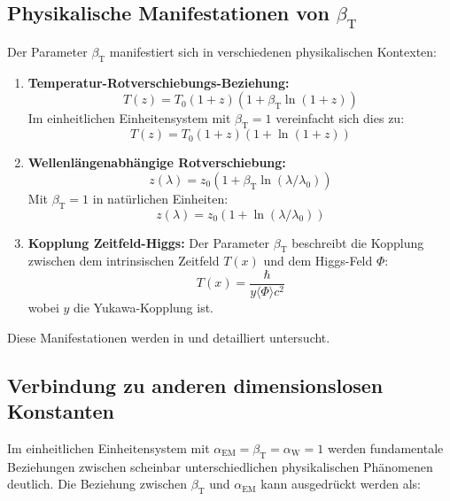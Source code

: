 \documentclass[12pt,a4paper]{article}
\newcommand{\Tfield}{T(x)}
\newcommand{\betaT}{\beta_{\text{T}}}
\newcommand{\alphaEM}{\alpha_{\text{EM}}}
\newcommand{\alphaW}{\alpha_{\text{W}}}
\begin{document}
	\subsection{Physikalische Manifestationen von \(\betaT\)}
	\label{subsec:beta_manifestations}
	
	Der Parameter \(\betaT\) manifestiert sich in verschiedenen physikalischen Kontexten:
	
	\begin{enumerate}
		\item \textbf{Temperatur-Rotverschiebungs-Beziehung:} 
		\begin{equation}
			\label{eq:temp_redshift}
			T(z) = T_0 (1 + z) (1 + \betaT \ln(1 + z))
		\end{equation}
		Im einheitlichen Einheitensystem mit \(\betaT = 1\) vereinfacht sich dies zu:
		\begin{equation}
			T(z) = T_0 (1 + z) (1 + \ln(1 + z))
		\end{equation}
		\item \textbf{Wellenlängenabhängige Rotverschiebung:} 
		\begin{equation}
			z(\lambda) = z_0 (1 + \betaT \ln(\lambda/\lambda_0))
		\end{equation}
		Mit \(\betaT = 1\) in natürlichen Einheiten:
		\begin{equation}
			z(\lambda) = z_0 (1 + \ln(\lambda/\lambda_0))
		\end{equation}
		\item \textbf{Kopplung Zeitfeld-Higgs:} Der Parameter \(\betaT\) beschreibt die Kopplung zwischen dem intrinsischen Zeitfeld \(\Tfield\) und dem Higgs-Feld \(\Phi\):
		\begin{equation}
			\Tfield = \frac{\hbar}{y \langle \Phi \rangle c^2}
		\end{equation}
		wobei \(y\) die Yukawa-Kopplung ist.
	\end{enumerate}
	
	Diese Manifestationen werden in \cite{pascher_params_2025} und \cite{pascher_alphabeta_2025} detailliert untersucht.
	
	\subsection{Verbindung zu anderen dimensionslosen Konstanten}
	\label{subsec:connection_constants}
	
	Im einheitlichen Einheitensystem mit \(\alphaEM = \betaT = \alphaW = 1\) werden fundamentale Beziehungen zwischen scheinbar unterschiedlichen physikalischen Phänomenen deutlich. Die Beziehung zwischen \(\betaT\) und \(\alphaEM\) kann ausgedrückt werden als:
	
\end{document}
